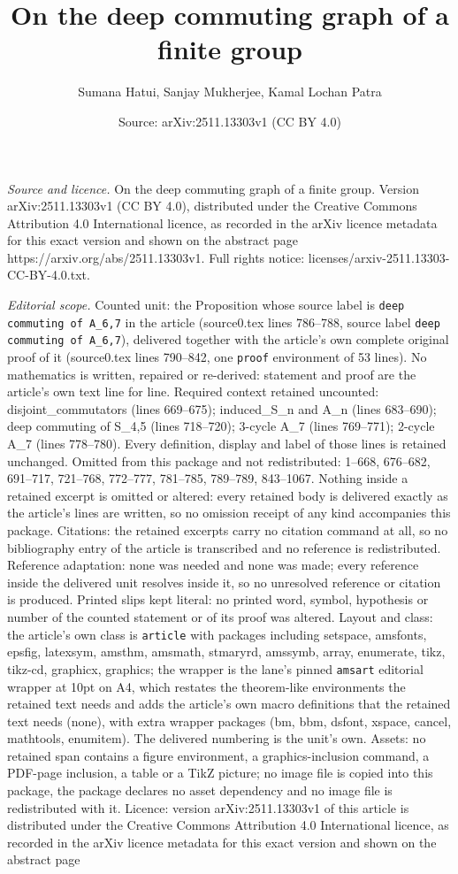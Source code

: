 \documentclass[10pt,a4paper]{amsart}
\title[On the deep commuting graph of a finite group]{On the deep commuting graph of a finite group}
\author{Sumana Hatui, Sanjay Mukherjee, Kamal Lochan Patra}
\date{Source: arXiv:2511.13303v1 (CC BY 4.0)}
\begin{document}
\maketitle

\noindent\emph{Source and licence.} On the deep commuting graph of a finite group. Version arXiv:2511.13303v1 (CC BY 4.0), distributed under the Creative Commons Attribution 4.0 International licence, as recorded in the arXiv licence metadata for this exact version and shown on the abstract page https://arxiv.org/abs/2511.13303v1. Full rights notice: licenses/arxiv-2511.13303-CC-BY-4.0.txt.\par\smallskip

\noindent\textit{Editorial scope.} Counted unit: the Proposition whose source label is \texttt{deep commuting of A\_6,7} in the article (source0.tex lines 786--788, source label \texttt{deep commuting of A\_6,7}), delivered together with the article's own complete original proof of it (source0.tex lines 790--842, one \texttt{proof} environment of 53 lines). No mathematics is written, repaired or re-derived: statement and proof are the article's own text line for line. Required context retained uncounted: disjoint\_commutators (lines 669--675); induced\_S\_n and A\_n (lines 683--690); deep commuting of S\_4,5 (lines 718--720); 3-cycle A\_7 (lines 769--771); 2-cycle A\_7 (lines 778--780). Every definition, display and label of those lines is retained unchanged. Omitted from this package and not redistributed: 1--668, 676--682, 691--717, 721--768, 772--777, 781--785, 789--789, 843--1067. Nothing inside a retained excerpt is omitted or altered: every retained body is delivered exactly as the article's lines are written, so no omission receipt of any kind accompanies this package. Citations: the retained excerpts carry no citation command at all, so no bibliography entry of the article is transcribed and no reference is redistributed. Reference adaptation: none was needed and none was made; every reference inside the delivered unit resolves inside it, so no unresolved reference or citation is produced. Printed slips kept literal: no printed word, symbol, hypothesis or number of the counted statement or of its proof was altered. Layout and class: the article's own class is \texttt{article} with packages including setspace, amsfonts, epsfig, latexsym, amsthm, amsmath, stmaryrd, amssymb, array, enumerate, tikz, tikz-cd, graphicx, graphics; the wrapper is the lane's pinned \texttt{amsart} editorial wrapper at 10pt on A4, which restates the theorem-like environments the retained text needs and adds the article's own macro definitions that the retained text needs (none), with extra wrapper packages (bm, bbm, dsfont, xspace, cancel, mathtools, enumitem). The delivered numbering is the unit's own. Assets: no retained span contains a figure environment, a graphics-inclusion command, a PDF-page inclusion, a table or a TikZ picture; no image file is copied into this package, the package declares no asset dependency and no image file is redistributed with it. Licence: version arXiv:2511.13303v1 of this article is distributed under the Creative Commons Attribution 4.0 International licence, as recorded in the arXiv licence metadata for this exact version and shown on the abstract page 
\end{document}
